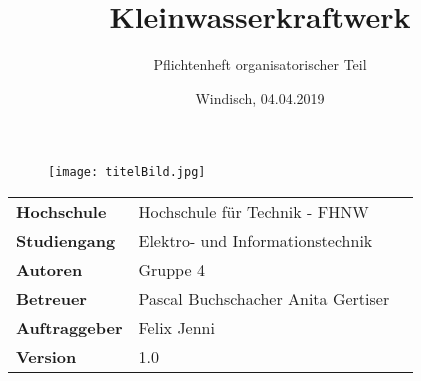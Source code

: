\documentclass[final]{fhnwreport}       %
\title{Kleinwasserkraftwerk}          			%
\author{Pflichtenheft organisatorischer Teil}   %
\date{Windisch, 04.04.2019}             		%
\begin{document}
\maketitle

\vspace*{-1cm}						    %
\vfill
\begin{figure}[H]
\centering
\texttt{[image: titelBild.jpg]}
\end{figure}
\vfill

{
\renewcommand\arraystretch{2}
\begin{center}
\begin{tabular}{ >{\bf} l p{10cm} l }
Hochschule&Hochschule für Technik - FHNW\\
Studiengang&Elektro- und Informationstechnik\\
Autoren&Gruppe 4\\%
Betreuer&Pascal Buchschacher \newline Anita Gertiser\\
Auftraggeber&Felix Jenni\\
Version&1.0 %
\end{tabular}
\end{center}
}

\clearpage

\thispagestyle{empty}
			
\tableofcontents
\clearpage









{\sloppypar
{}	
\setlength{\bibitemsep}{\baselineskip}
\printbibliography[heading=bibintoc]
\label{sec:lit}
}

{%
}
\end{document}
